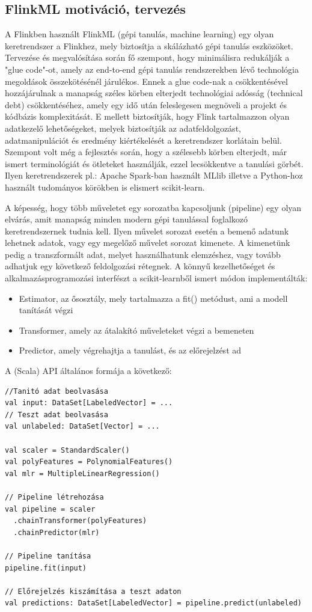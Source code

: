 \documentclass[a4paper,12pt]{article}
\begin{document}
\subsection{FlinkML motiváció, tervezés}

A Flinkben használt FlinkML (gépi tanulás, machine learning) egy olyan keretrendszer a Flinkhez, mely biztosítja a skálázható gépi tanulás eszközöket. Tervezése és megvalósítása során fő szempont, hogy minimálisra redukálják a "glue code"-ot, amely az end-to-end gépi tanulás rendszerekben lévő technológia megoldások összekötésénél járulékos. Ennek a glue code-nak a csökkentésével hozzájárulnak a manapság széles körben elterjedt technológiai adósság (technical debt) csökkentéséhez, amely egy idő után feleslegesen megnöveli a projekt és kódbázis komplexitását.\cite{mldebt} E mellett biztosítják, hogy Flink tartalmazzon olyan adatkezelő lehetőségeket, melyek biztosítják az adatfeldolgozást, adatmanipulációt és eredmény kiértékelését a keretrendszer korlátain belül. Szempont volt még a fejlesztés során, hogy a szélesebb körben elterjedt, már ismert terminológiát és ötleteket használják, ezzel lecsökkentve a tanulási görbét. Ilyen keretrendszerek pl.: Apache Spark-ban használt MLlib\cite{mllib} illetve a Python-hoz használt tudományos körökben is elismert scikit-learn.\cite{scikit} \newline

A képesség, hogy több műveletet egy sorozatba kapcsoljunk (pipeline) egy olyan elvárás, amit manapság minden modern gépi tanulással foglalkozó keretrendszernek tudnia kell. Ilyen művelet sorozat esetén a bemenő adatunk lehetnek adatok, vagy egy megelőző művelet sorozat kimenete. A kimenetünk pedig a transzformált adat, melyet használhatunk elemzéshez, vagy tovább adhatjuk egy következő feldolgozási rétegnek.  A könnyű kezelhetőséget és alkalmazásprogramozási interfészt a scikit-learnből\cite{sciapi} ismert módon implementálták: 
\begin{itemize}
\item Estimator, az ősosztály, mely tartalmazza a fit() metódust, ami a modell tanítását végzi
\item Transformer, amely az átalakító műveleteket végzi a bemeneten
\item Predictor, amely végrehajtja a tanulást, és az előrejelzést ad
\end{itemize}

A (Scala) API általános formája a következő:

\begin{lstlisting}[style=Scala]
//Tanitó adat beolvasása
val input: DataSet[LabeledVector] = ...
// Teszt adat beolvasása
val unlabeled: DataSet[Vector] = ...

val scaler = StandardScaler()
val polyFeatures = PolynomialFeatures()
val mlr = MultipleLinearRegression()

// Pipeline létrehozása
val pipeline = scaler
  .chainTransformer(polyFeatures)
  .chainPredictor(mlr)

// Pipeline tanítása
pipeline.fit(input)

// Előrejelzés kiszámítása a teszt adaton
val predictions: DataSet[LabeledVector] = pipeline.predict(unlabeled)
\end{lstlisting}
\end{document}
